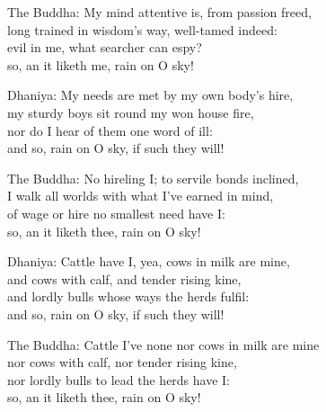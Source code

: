  \begin{MyDescription}{The Buddha:}
My mind attentive is, from passion freed,\\
long trained in wisdom's way, well-tamed indeed:\\
evil in me, what searcher can espy?\\
so, an it liketh me, rain on O sky!
          \end{MyDescription} 
          
 \begin{MyDescription}{Dhaniya:}
My needs are met by my own body's hire,\\
my sturdy boys sit round my won house fire,\\
nor do I hear of them one word of ill:\\
and so, rain on O sky, if such they will!
          \end{MyDescription} 
          
  \begin{MyDescription}{The Buddha:}
No hireling I; to servile bonds inclined,\\
I walk all worlds with what I've earned in mind,\\
of wage or hire no smallest need have I:\\
so, an it liketh thee, rain on O sky!
            \end{MyDescription} 

 
\begin{MyDescription}{Dhaniya:}  	
Cattle have I, yea, cows in milk are mine,\\
and cows with calf, and tender rising kine,\\
and lordly bulls whose ways the herds fulfil:\\
and so, rain on O sky, if such they will!
             \end{MyDescription}    
 
 \begin{MyDescription}{The Buddha:}  	
Cattle I've none nor cows in milk are mine\\
nor cows with calf, nor tender rising kine,\\
nor lordly bulls to lead the herds have I:\\
so, an it liketh thee, rain on O sky!
              \end{MyDescription}    
   
